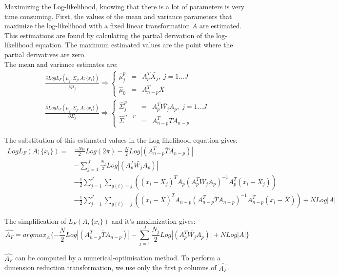 Maximizing the Log-likelihood, knowing that there is a lot of parameters is very time consuming.
First, the values of the mean and variance parameters that maximize the log-likelihood with a fixed linear transformation $A$ are estimated.
This estimations are found by calculating the partial derivation of the log-likelihood equation. The maximum estimated values are the point where the partial derivatives are zero. \\
The mean and variance estimates are:
$$
\begin{array}{cc}
  \frac{\partial Log L_F(\mu_j, \Sigma_j, A; \{x_i\})}{\partial \mu_j} \Rightarrow \left \{
  \begin{array}{ccc}
    \hat\mu_j^p & = & A_p^T\bar{X_j} ,\; j = 1...J\\
    \hat\mu_0 & = & A_{n - p}^T\bar{X}
  \end{array}
  \right . \\
  \frac{\partial Log L_F(\mu_j, \Sigma_j, A; \{x_i\})}{\partial \Sigma_j} \Rightarrow \left \{
  \begin{array}{ccc}
    \hat\Sigma_j^p & = & A_p^T\bar{W_j}A_p, \; j = 1...J\\
    \hat\Sigma^{n - p} & = & A_{n - p}^T\bar{T}A_{n - p}
  \end{array}
  \right .
\end{array}$$

The substitution of this estimated values in the Log-likelihood equation gives:
$$
\begin{array}{cl}
  Log L_F(A; \{x_i\}) = & \frac{-N n}{2}Log(2\pi)-\frac{N}{2}Log|(A_{n - p}^T\bar{T}A_{n - p})| \\
  & - \sum\limits_{j = 1}^J
  \frac{N_j}{2}Log|(A_p^T\bar{W_j}A_p)| \\
  & - \frac{1}{2}\sum\limits_{j = 1}^J\sum\limits_{g(i) = j} ((x_i - \bar{X_j})^TA_p(A_p^T\bar{W_j}A_p)^{-1}
  A_p^T(x_i - \bar{X_j})) \\
  & - \frac{1}{2}\sum\limits_{j = 1}^J\sum\limits_{g(i) = j} ((x_i - \bar{X})^TA_{n - p}(A_{n - p}^T\bar{T}A_{n - p})^{-1}
  A_{n - p}^T(x_i - \bar{X})) + N Log|A|
  \end{array}$$

The simplification of $L_F(A, \{x_i\})$ and it's maximization gives:
$$ \hat{A_F} = argmax_A\{-\frac{N}{2}Log|(A_{n - p}^T\bar{T}A_{n - p})| - \sum\limits_{j = 1}^J\frac{N_j}{2}Log|(A_p^T\bar{W_j}A_p)|
+ N Log|A|\}$$

$\hat{A_F}$ can be computed by a numerical-optimisation method.
To perform a dimension reduction transformation, we use only the first p columns of $\hat{A_F}$.

